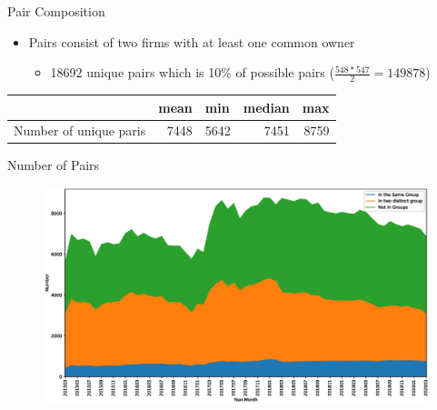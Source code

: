 \documentclass{beamer}
\begin{document}
	\begin{frame}{Pair Composition}
		\begin{itemize}
		
			\item Pairs consist of two firms  with at least one common owner
			\begin{itemize}
				\item  18692 unique pairs which is 10\% of possible pairs 
				\tiny ($ \frac{548*547}{2}= 149878 $)
				\normalsize
			\end{itemize}
		\end{itemize}
		
		\begin{table}[htbp]
			\centering
			{
				\footnotesize
				\begin{tabular}{lrrrr}
					\hline
					\hline
					& \multicolumn{1}{l}{mean} & \multicolumn{1}{l}{min} & median  & \multicolumn{1}{l}{max} \\
					\hline
					Number of unique paris  & 7448  & 5642  & 7451  & 8759 \\
					\hline
					\hline
				\end{tabular}
				
			}
		\end{table}
		
		
		\begin{table}
			\resizebox{0.7\textwidth}{!}
			{
				
			}
		\end{table}%
		
	\end{frame}  
	
	
	

	\begin{frame}{Number of Pairs}
		\begin{figure}[htbp]
			\includegraphics[width=0.9\linewidth]{idMonth.eps}
		\end{figure}
	\end{frame}
	
\end{document}
